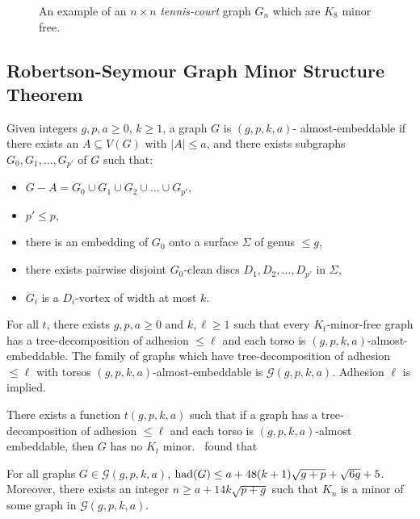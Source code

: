 \begin{figure}[h]
	\centering
	
	\caption{An example of an $n \times n$ \textit{tennis-court} graph $G_n$ which are \(K_8\) minor free.}
	\label{fig:tenniscourt}
\end{figure}
\subsection{Robertson-Seymour Graph Minor Structure Theorem}\label{ssec:Robertson_Seymour_Graph_Structure}
Given integers \(g, p, a \geq 0\), \(k \geq 1\), a graph \(G\) is \((g, p, k, a)\)- almost-embeddable if there exists an \(A \subseteq V(G)\) with \(|A| \leq a\), and there exists subgraphs \(G_0, G_1, \ldots,  G_{p'}\) of \(G\) such that:
\begin{itemize}
	\item \(G - A = G_0 \cup G_1 \cup G_2 \cup \ldots \cup G_{p'}\),
	\item \(p' \leq p\),
	\item there is an embedding of \(G_0\) onto a surface \(\Sigma\) of genus \(\leq g\),
	\item there exists pairwise disjoint \(G_0\)-clean discs \(D_1, D_2, \ldots, D_{p'}\) in \(\Sigma\),
	\item \(G_i\) is a \(D_i\)-vortex of width at most \(k\).
\end{itemize}

\begin{theorem}\label{thm:gmst}
	For all \(t\), there exists \(g, p, a \geq 0\) and \(k, \ell \geq 1\) such that every \(K_t\)-minor-free graph has a tree-decomposition of adhesion \(\leq \ell\) and each torso is \((g, p, k, a)\)-almost-embeddable. The  family of graphs which have tree-decomposition of adhesion $\leq \ell$ with torsos $(g, p, k, a)$-almost-embeddable is \(\mathcal{G}(g, p, k, a)\). Adhesion $\ell$ is implied. 
\end{theorem}
There exists a function \(t(g, p, k, a)\) such that if a graph has a tree-decomposition of adhesion \(\leq \ell\) and each torso is \((g, p, k, a)\)-almost embeddable, then \(G\) has no \(K_t\) minor.\ \textcite{joretCompleteGraphMinors2013} found that
\begin{theorem}\label{thm:graph_structure_bound_theorem}
	For all graphs \(G \in \mathcal{G}(g, p, k, a)\),
	\(\operatorname{had}(G) \leq a + 48(k + 1)\sqrt{g + p} + \sqrt{6g} + 5\). Moreover, there exists an integer \(n \geq a + 1 4 k\sqrt{p + g}\) such that \(K_n\) is a minor of some graph in \(\mathcal{G}(g, p, k, a)\).
\end{theorem}

